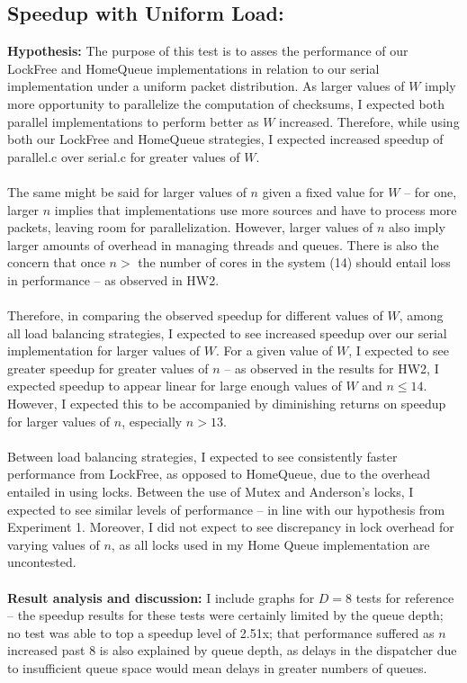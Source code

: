 \documentclass[]{article}
\begin{document}
\subsection{Speedup with Uniform Load:}
\textbf{Hypothesis:}
The purpose of this test is to asses the performance of our LockFree and HomeQueue implementations in relation to our serial implementation under a uniform packet distribution. As larger values of $W$ imply more opportunity to parallelize the computation of checksums, I expected both parallel implementations to perform better as $W$ increased. Therefore, while using both our LockFree and HomeQueue strategies,  I  expected increased speedup of parallel.c over serial.c for greater values of $W$. 
\\\\
The same might be said for larger values of $n$ given a fixed value for $W$ -- for one, larger $n$ implies that implementations use more sources and have to process more packets, leaving room for parallelization. However, larger values of $n$ also imply larger amounts of overhead in managing threads and queues. There is also the concern that once $n >$ the number of cores in the system (14) should entail loss in performance -- as observed in HW2.
\\\\
Therefore, in comparing the observed speedup for different values of $W$, among all load balancing strategies, I expected to see increased speedup over our serial implementation for larger values of $W$. For a given value of $W$, I expected to see greater speedup for greater values of $n$ -- as observed in the results for HW2, I expected speedup to appear linear for large enough values of $W$ and $n \leq 14$. However, I expected this to be accompanied by diminishing returns on speedup for larger values of $n$, especially $n > 13$.
\\\\
Between load balancing strategies, I expected to see consistently faster performance from LockFree, as opposed to HomeQueue, due to the overhead entailed in using locks. Between the use of Mutex and Anderson's locks, I expected to see similar levels of performance -- in line with our hypothesis from Experiment 1. Moreover, I did not expect to see discrepancy in lock overhead for varying values of $n$, as all locks used in my Home Queue implementation are uncontested.
\\\\
\textbf{Result analysis and discussion:}
I include graphs for $D = 8$ tests for reference -- the speedup results for these tests were certainly limited by the queue depth; no test was able to top a speedup level of 2.51x; that performance suffered as $n$ increased past 8 is also explained by queue depth, as delays in the dispatcher due to insufficient queue space would mean delays in greater numbers of queues.
\end{document}

